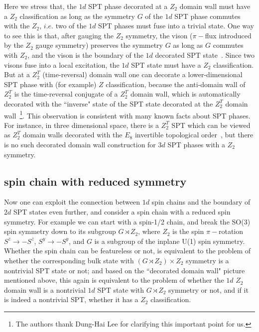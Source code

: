 \documentclass[aps,prb,twocolumn,superscriptaddress,showpacs]{revtex4}
\begin{document}
Here we stress that, the $1d$ SPT phase decorated at a $Z_2$
domain wall must have a $Z_2$ classification as long as the
symmetry $G$ of the $1d$ SPT phase commutes with the $Z_2$, $i.e.$
two of the $1d$ SPT phases must fuse into a trivial state. One way
to see this is that, after gauging the $Z_2$ symmetry, the vison
($\pi-$flux introduced by the $Z_2$ gauge symmetry) preserves the
symmetry $G$ as long as $G$ commutes with $Z_2$, and the vison is
the boundary of the $1d$ decorated SPT state~\cite{chenluashvin}.
Since two visons fuse into a local excitation, the $1d$ SPT state
must have a $Z_2$ classification. But at a $Z_2^T$ (time-reversal)
domain wall one can decorate a lower-dimensional SPT phase with
(for example) $Z$ classification, because the anti-domain wall of
$Z_2^T$ is the time-reversal conjugate of a $Z_2^T$ domain wall,
which is automatically decorated with the ``inverse" state of the
SPT state decorated at the $Z_2^T$ domain wall~\footnote{The
authors thank Dung-Hai Lee for clarifying this important point for
us.}. This observation is consistent with many known facts about
SPT phases. For instance, in three dimensional space, there is a
$Z_2^T$ SPT which can be viewed as $Z_2^T$ domain walls decorated
with the $E_8$ invertible topological order~\cite{senthilashvin},
but there is no such decorated domain wall construction for $3d$
SPT phases with a $Z_2$ symmetry.


\subsection{spin chain with reduced symmetry}

Now one can exploit the connection between $1d$ spin chains and
the boundary of $2d$ SPT states even further, and consider a spin
chain with a reduced spin symmetry. For example we can start with
a spin-1/2 chain, and break the SO(3) spin symmetry down to its
subgroup $G \rtimes Z_2$, where $Z_2$ is the spin $\pi-$rotation
$S^z \rightarrow - S^z$, $S^y \rightarrow - S^y$, and $G$ is a
subgroup of the inplane U(1) spin symmetry. Whether the spin chain
can be featureless or not, is equivalent to the problem of whether
the corresponding bulk state with $(G \rtimes Z_2) \times Z_2$
symmetry is a nontrivial SPT state or not; and based on the
``decorated domain wall" picture mentioned above, this again is
equivalent to the problem of whether the $1d$ $Z_2$ domain wall is
a nontrivial $1d$ SPT state with $G \rtimes Z_2$ symmetry or not,
and if it is indeed a nontrivial SPT, whether it has a $Z_2$
classification.
\end{document}
